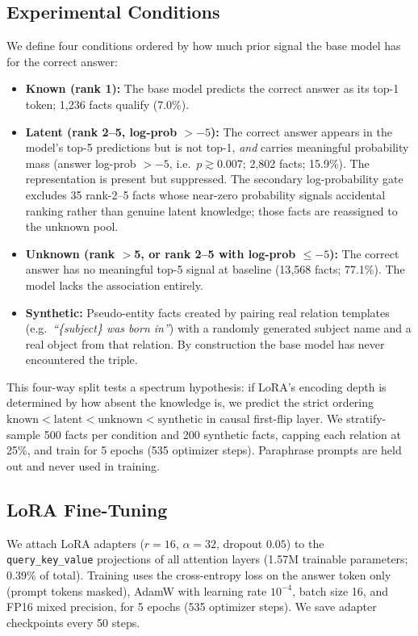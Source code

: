 \documentclass[11pt]{article}
\begin{document}
\subsection{Experimental Conditions}
We define four conditions ordered by how much prior signal the base model has
for the correct answer:
\begin{itemize}
  \item \textbf{Known (rank 1):} The base model predicts the correct answer
    as its top-1 token; 1{,}236 facts qualify (7.0\%).
  \item \textbf{Latent (rank 2--5, log-prob $> -5$):} The correct answer
    appears in the model's top-5 predictions but is not top-1, \emph{and}
    carries meaningful probability mass (answer log-prob $> -5$, i.e.\
    $p \gtrsim 0.007$; 2{,}802 facts; 15.9\%).
    The representation is present but suppressed.
    The secondary log-probability gate excludes 35 rank-2--5 facts whose
    near-zero probability signals accidental ranking rather than genuine latent
    knowledge; those facts are reassigned to the unknown pool.
  \item \textbf{Unknown (rank $>$5, or rank 2--5 with log-prob $\le -5$):}
    The correct answer has no meaningful top-5 signal at baseline
    (13{,}568 facts; 77.1\%). The model lacks the association entirely.
  \item \textbf{Synthetic:} Pseudo-entity facts created by pairing real
    relation templates (e.g.\ \emph{``\{subject\} was born in''}) with a
    randomly generated subject name and a real object from that relation.
    By construction the base model has never encountered the triple.
\end{itemize}
This four-way split tests a spectrum hypothesis: if LoRA's encoding depth is
determined by how absent the knowledge is, we predict the strict ordering
$\text{known} < \text{latent} < \text{unknown} < \text{synthetic}$
in causal first-flip layer.
We stratify-sample 500 facts per condition and 200 synthetic facts, capping
each relation at 25\%, and train for 5 epochs (535 optimizer steps).
Paraphrase prompts are held out and never used in training.

\subsection{LoRA Fine-Tuning}
We attach LoRA adapters ($r=16$, $\alpha=32$, dropout $0.05$) to the
\texttt{query\_key\_value} projections of all attention layers (1.57M trainable
parameters; 0.39\% of total).
Training uses the cross-entropy loss on the answer token only (prompt tokens
masked), AdamW with learning rate $10^{-4}$, batch size 16, and FP16 mixed precision, for 5 epochs (535
optimizer steps).
We save adapter checkpoints every 50 steps.
\end{document}

